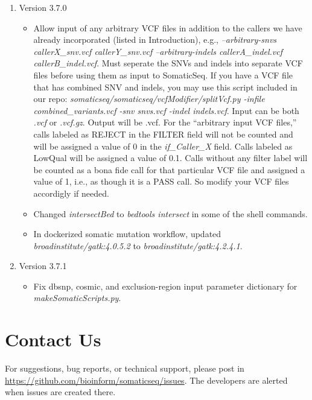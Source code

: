 \documentclass[10pt,letterpaper]{article}
\begin{document}
\begin{sloppypar}
\begin{enumerate}
\begin{itemize}
        \end{itemize}


	\item Version 3.7.0
	
        \begin{itemize}
            \item Allow input of any arbitrary VCF files in addition to the callers we have already incorporated (listed in Introduction), e.g., \textit{--arbitrary-snvs callerX\_snv.vcf callerY\_snv.vcf --arbitrary-indels callerA\_indel.vcf callerB\_indel.vcf}. Must seperate the SNVs and indels into separate VCF files before using them as input to SomaticSeq. If you have a VCF file that has combined SNV and indels, you may use this script included in our repo: \textit{somaticseq/somaticseq/vcfModifier/splitVcf.py -infile combined\_variants.vcf -snv snvs.vcf -indel indels.vcf}. Input can be both \textit{.vcf} or \textit{.vcf.gz}. Output will be .vcf. For the ``arbitrary input VCF files,'' calls labeled as REJECT in the FILTER field will not be counted and will be assigned a value of 0 in the \textit{if\_Caller\_X} field. Calls labeled as LowQual will be assigned a value of 0.1. Calls without any filter label will be counted as a bona fide call for that particular VCF file and assigned a value of 1, i.e., as though it is a PASS call. So modify your VCF files accordigly if needed.
            
            \item Changed \textit{intersectBed} to \textit{bedtools intersect} in some of the shell commands.
            
            \item In dockerized somatic mutation workflow, updated \textit{broadinstitute/gatk:4.0.5.2} to \textit{broadinstitute/gatk:4.2.4.1}. 
        \end{itemize}
        
	\item Version 3.7.1
	
        \begin{itemize}
            \item Fix dbsnp, cosmic, and exclusion-region input parameter dictionary for \textit{makeSomaticScripts.py}.
        \end{itemize}
    
\end{enumerate}




\section{Contact Us}
For suggestions, bug reports, or technical support, please post in \href{https://github.com/bioinform/somaticseq/issues}{https://github.com/bioinform/somaticseq/issues}. The developers are alerted when issues are created there. 











\end{sloppypar}
\end{document}
